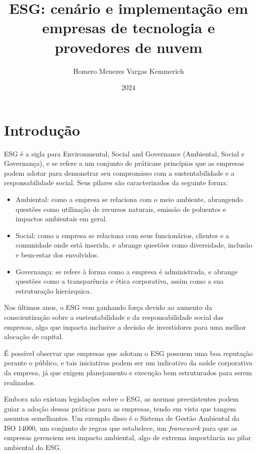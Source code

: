\documentclass[12pt]{article}
\begin{document}
	\title{ESG: cenário e implementação em empresas de tecnologia e provedores de nuvem}
	
	\author{Homero Menezes Vargas Kemmerich}
	
	\date{2024}
	
	\address{Instituto de Tecnologia -- Universidade de Passo Fundo (UPF)\\
		99052-900 -- Passo Fundo -- RS -- Brasil
		\
	}	
	
	
	\section*{Introdução}
	ESG é a sigla para Environmental, Social and Governance (Ambiental, Social e Governança), e se refere a um conjunto de práticase princípios que as empresas podem adotar para demonstrar seu compromisso com a sustentabilidade e a responsabilidade social. Seus pilares são caracterizados da seguinte forma:
	\begin{itemize}
		\item Ambiental: como a empresa se relaciona com o meio ambiente, abrangendo questões como utilização de recursos naturais, emissão de poluentes e impactos ambientais em geral.
		\item Social: como a empresa se relaciona com seus funcionários, clientes e a comunidade onde está inserida, e abrange questões como diversidade, inclusão e bem-estar dos envolvidos.
		\item Governança: se refere à forma como a empresa é administrada, e abrange questões como a transparência e ética corporativa, assim como a sua estruturação hierárquica.
	\end{itemize}
	Nos últimos anos, o ESG vem ganhando força devido ao aumento da conscientização sobre a sustentabilidade e da responsabilidade social das empresas, algo que impacta inclusive a decisão de investidores para uma melhor alocação de capital.
	
	É possível observar que empresas que adotam o ESG possuem uma boa reputação perante o público, e tais iniciativas podem ser um indicativo da saúde corporativa da empresa, já que exigem planejamento e execução bem estruturados para serem realizados.
	
	Embora não existam legislações sobre o ESG, as normas preexistentes podem guiar a adoção dessas práticas para as empresas, tendo em vista que tangem assuntos semelhantes. Um exemplo disso é o Sistema de Gestão Ambiental da ISO 14000, um conjunto de regras que estabelece, um \emph{framework} para que as empresas gerenciem seu impacto ambiental, algo de extrema importância no pilar ambiental do ESG.
	
\end{document}
